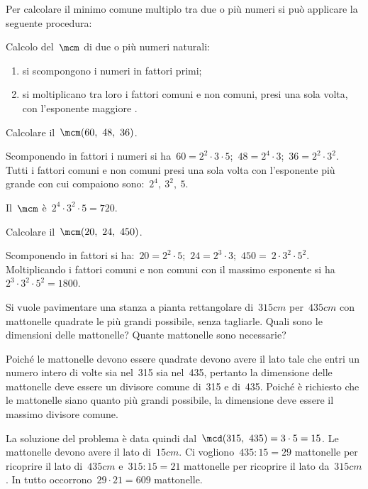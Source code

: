 Per calcolare il minimo comune multiplo tra due o più numeri si può 
applicare la seguente procedura:

\begin{procedura}{}{}
Calcolo del~\(\mcm\) di due o più numeri naturali:
\begin{enumerate}[noitemsep, label=(\alph*)]
 \item si scompongono i numeri in fattori primi;
 \item si moltiplicano tra loro i fattori comuni e non comuni, 
  presi una sola volta, con l'esponente maggiore .
\end{enumerate}
\end{procedura}


 \begin{esempio}{}{}
 Calcolare il~\(\mcm(60,~48,~36)\).

Scomponendo in fattori i numeri si 
ha~\(60=2^2\cdot3\cdot5\);~\(48=2^4\cdot3\);~\(36 =2^2\cdot3^2\).
Tutti i fattori comuni e non comuni presi una sola volta con l'esponente 
più grande con cui compaiono sono:~\(2^4,~3^2,~5\).

Il~\(\mcm\) è~\(2^4\cdot3^2\cdot5=720\).
 \end{esempio}

 \begin{esempio}{}{}
 Calcolare il~\(\mcm(20,~24,~450)\).

Scomponendo in fattori si 
ha:~\(20=2^2\cdot5\);~\(24=2^3\cdot3\);~\(450 =~2\cdot3^2\cdot5^2\).
Moltiplicando i fattori comuni e non comuni con il massimo esponente 
si ha~\(2^3\cdot3^2\cdot5^2=1800\).
 \end{esempio}

 \begin{esempio}{}{}
Si vuole pavimentare una stanza a pianta rettangolare di~\(315\unit{cm}\) 
per~\(435\unit{cm}\) con mattonelle quadrate le più grandi possibile, 
senza tagliarle. 
Quali sono le dimensioni delle  mattonelle? 
Quante mattonelle sono necessarie?

Poiché le mattonelle devono essere quadrate devono avere il lato tale che 
entri un numero intero di volte sia nel~315 sia nel~435, pertanto la 
dimensione delle mattonelle deve essere un divisore comune
di~315 e di~435. Poiché è richiesto che le mattonelle siano quanto più 
grandi possibile, la dimensione deve essere il massimo divisore comune.

\hspace*{-12mm}\esematt
% 
% 

La soluzione del problema è data quindi dal~\(\mcd(315,~435)=3 \cdot 5=15\). 
Le mattonelle devono avere il lato di~\(15\unit{cm}\).
Ci vogliono~\(435:15=29\) mattonelle per ricoprire il lato 
di~\(435\unit{cm}\) e~\(315:15=21\) mattonelle per ricoprire il lato
da~\(315\unit{cm}\). In tutto occorrono~\(29\cdot21=609\) mattonelle.
\end{esempio}

